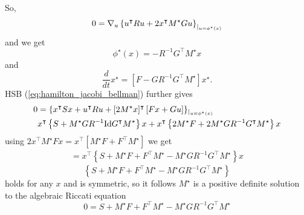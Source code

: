 So, 
\begin{align*}
    0=\nabla_u\left\{u^\intercal R u+2 x^\intercal M^\star Gu \right\}_{|_{u=\phi^\star(x)}}
\end{align*}
and we get 
\[\phi^\star(x)=-R^{-1}G^\intercal M^\star x\]
and 
\[\frac{d}{dt}x^\star=\left[F-GR^{-1}G^\intercal M^\star\right]x^\star.\]
HSB (\ref{eq:hamilton_jacobi_bellman}) further gives 
\begin{align*}
    0&=\{x^\intercal S x+ u^\intercal R u+[2M^\star x]^\intercal \left[Fx+Gu\right]\}_{|_{u=\phi^\star(x)}}\\
    &x^\intercal \left\{S+M^\star GR^{-1}\text{Id} G^\intercal M^\star \right\}x+x^\intercal\left\{2M^\star F+2M^\star G R^{-1}G^\intercal M^\star \right\}x
\end{align*}
using \(2x^\intercal M^\star Fx=x^\intercal \left[M^\star F + F^\intercal M^\star\right]\)
we get 
\begin{align*}
    =x^\intercal \left\{S+M^\star F+ F^\intercal M^\star-M^\star GR^{-1}G^\intercal M^\star\right\}x %
\end{align*}
\[\left\{S+M^\star F+ F^\intercal M^\star-M^\star GR^{-1}G^\intercal M^\star\right\}\]
holds for any \(x\) and is symmetric, so it follows \(M^\star\) is a positive definite solution to the 
algebraic Riccati equation 
\[0=S+M^\star F+ F^\intercal M^\star- M^\star GR^{-1}G^\intercal M^\star\]

